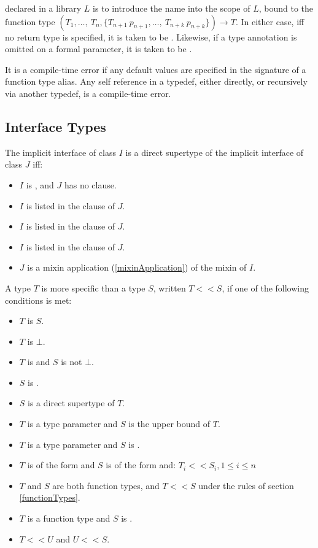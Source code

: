 \documentclass[makeidx]{article}
\begin{document}
{

\noindent
declared in a library $L$ is to introduce the name \id{} into the scope of $L$, bound to the function type
$(T_1, \ldots,\ T_n, \{T_{n+1}\ p_{n+1}, \ldots,\ T_{n+k}\ p_{n+k}\}) \rightarrow T$.
In either case, if{}f no return type is specified, it is taken to be \DYNAMIC{}.
Likewise, if a type annotation is omitted on a formal parameter, it is taken to be \DYNAMIC{}.

\LMHash{}%
It is a compile-time error if any default values are specified in the signature of a function type alias.
Any self reference in a typedef, either directly, or recursively via another typedef, is a compile-time error.


\subsection{Interface Types}

\LMHash{}%
The implicit interface of class $I$ is a direct supertype of the implicit interface of class $J$ if{}f:
\begin{itemize}
\item $I$ is , and $J$ has no \EXTENDS{} clause.
\item $I$ is listed in the \EXTENDS{} clause of $J$.
\item $I$ is listed in the \IMPLEMENTS{} clause of $J$.
\item $I$ is listed in the \WITH{} clause of $J$.
\item $J$ is a mixin application (\ref{mixinApplication}) of the mixin of $I$.
\end{itemize}

\LMHash{}%
A type $T$ is more specific than a type $S$, written $T << S$, if one of the following conditions is met:
\begin{itemize}
\item $T$ is $S$.
\item $T$ is $\bot$.
\item $T$ is  and $S$ is not $\bot$.
\item $S$ is \DYNAMIC{}.
\item $S$ is a direct supertype of $T$.
\item $T$ is a type parameter and $S$ is the upper bound of $T$.
\item $T$ is a type parameter and $S$ is .
\item $T$ is of the form  and $S$ is of the form  and:
$T_i << S_i, 1 \le i \le n$
\item $T$ and $S$ are both function types, and $T << S$ under the rules of section \ref{functionTypes}.
\item $T$ is a function type and $S$ is \FUNCTION{}.
\item $T << U$ and $U << S$.
\end{itemize}

}
\end{document}
